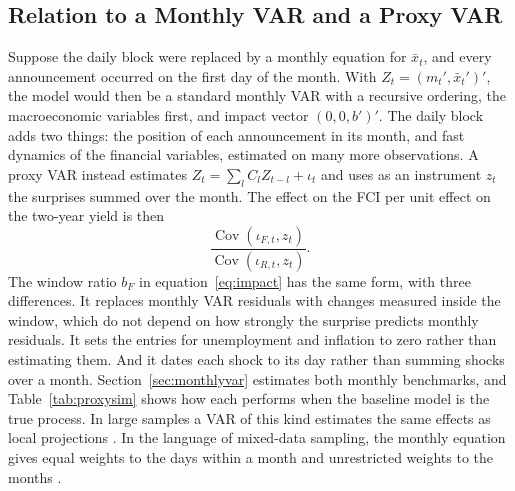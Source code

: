 \documentclass[11pt]{article}
\begin{document}
\begin{appendices}
\FloatBarrier
\section{Relation to a Monthly VAR and a Proxy VAR}\label{app:relation}
Suppose the daily block were replaced by a monthly equation for $\bar x_t$, and every announcement occurred on the first day of the month. With $Z_t=(m_t',\bar x_t')'$, the model would then be a standard monthly VAR with a recursive ordering, the macroeconomic variables first, and impact vector $(0,0,b')'$. The daily block adds two things: the position of each announcement in its month, and fast dynamics of the financial variables, estimated on many more observations. A proxy VAR \citep{gertler2015,mertens2013,stock2018} instead estimates $Z_t=\sum_l C_l Z_{t-l}+\iota_t$ and uses as an instrument $z_t$ the surprises summed over the month. The effect on the FCI per unit effect on the two-year yield is then
\begin{equation}
\frac{\operatorname{Cov}(\iota_{F,t},z_t)}{\operatorname{Cov}(\iota_{R,t},z_t)}. \label{eq:proxy}
\end{equation}
The window ratio $b_F$ in equation~\eqref{eq:impact} has the same form, with three differences. It replaces monthly VAR residuals with changes measured inside the window, which do not depend on how strongly the surprise predicts monthly residuals. It sets the entries for unemployment and inflation to zero rather than estimating them. And it dates each shock to its day rather than summing shocks over a month. Section~\ref{sec:monthlyvar} estimates both monthly benchmarks, and Table~\ref{tab:proxysim} shows how each performs when the baseline model is the true process. In large samples a VAR of this kind estimates the same effects as local projections \citep{plagborg2021}. In the language of mixed-data sampling, the monthly equation gives equal weights to the days within a month and unrestricted weights to the months \citep{ghysels2007,foroni2015}.



\FloatBarrier

\end{appendices}
\end{document}
